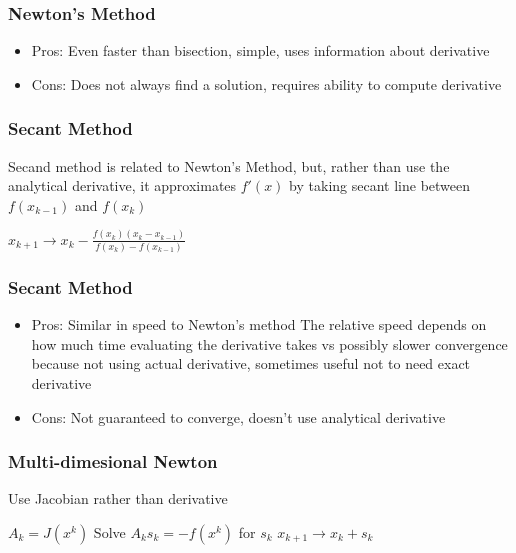 \documentclass[10pt]{beamer}
\begin{document}
\begin{frame} \frametitle{Newton's Method}
  \begin{itemize}
    \item Pros: Even faster than bisection, simple, uses information about derivative
    \item Cons: Does not always find a solution, requires ability to compute derivative
  \end{itemize}
\end{frame}

\begin{frame} \frametitle{Secant Method}
  Secand method is related to Newton's Method, but, rather than use the analytical derivative, it approximates $f'(x)$ by taking secant line between $f(x_{k-1})$ and $f(x_k)$

  \vspace{0.5cm}

  \begin{algorithmic}

    \STATE $x_{k+1} \rightarrow x_k - \frac{f(x_k) (x_k - x_{k-1})}{f(x_k) - f(x_{k-1})}$
    \ENDWHILE

  \end{algorithmic}

\end{frame}

\begin{frame} \frametitle{Secant Method}
  \begin{itemize}
    \item Pros: Similar in speed to Newton's method \textemdash{} The relative speed depends on how much time evaluating the derivative takes vs possibly slower convergence because not using actual derivative, sometimes useful not to need exact derivative
    \item Cons: Not guaranteed to converge, doesn't use analytical derivative
  \end{itemize}
\end{frame}

\begin{frame} \frametitle{Multi-dimesional Newton}

  Use Jacobian rather than derivative

  \vspace{0.5cm}

  \begin{algorithmic}

    \STATE $A_k = J(x^k)$
    \STATE Solve $A_k s_k = - f(x^k)$ for $s_k$
    \STATE $x_{k+1} \rightarrow x_k + s_k$
    \ENDWHILE

  \end{algorithmic}

\end{frame}
\end{document}
